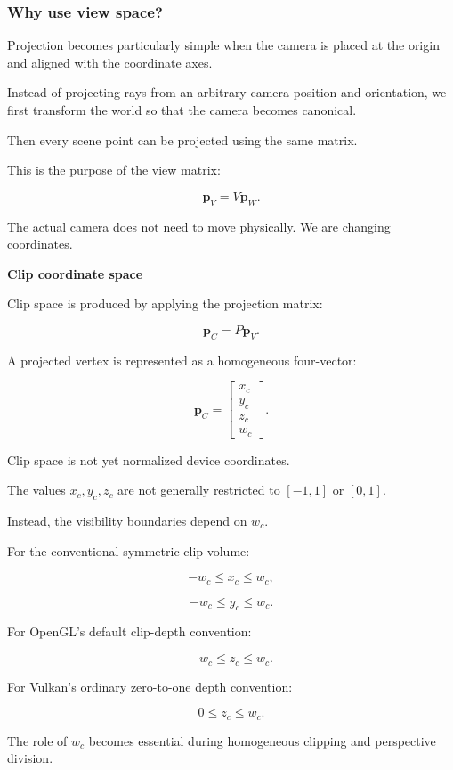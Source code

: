 \subsubsection{Why use view space?}\label{02-foundations-ii-ch032-why-use-view-space}

Projection becomes particularly simple when the camera is placed at the origin and aligned with the coordinate axes.

Instead of projecting rays from an arbitrary camera position and orientation, we first transform the world so that the camera becomes canonical.

Then every scene point can be projected using the same matrix.

This is the purpose of the view matrix:

\[
 \boxed{ \mathbf p_V=V\mathbf p_W }.
\]

The actual camera does not need to move physically. We are changing coordinates.

\textbf{Clip coordinate space}

Clip space is produced by applying the projection matrix:

\[
 \boxed{ \mathbf p_C=P\mathbf p_V }.
\]

A projected vertex is represented as a homogeneous four-vector:

\[
 \mathbf p_C= \begin{bmatrix} x_c\\y_c\\z_c\\w_c \end{bmatrix}.
\]

Clip space is not yet normalized device coordinates.

The values \(x_c,y_c,z_c\) are not generally restricted to \([-1,1]\) or \([0,1]\).

Instead, the visibility boundaries depend on \(w_c\).

For the conventional symmetric clip volume:

\[
 -w_c\le x_c\le w_c,
\]

\[
 -w_c\le y_c\le w_c.
\]

For OpenGL's default clip-depth convention:

\[
 -w_c\le z_c\le w_c.
\]

For Vulkan's ordinary zero-to-one depth convention:

\[
 0\le z_c\le w_c.
\]

The role of \(w_c\) becomes essential during homogeneous clipping and perspective division.

